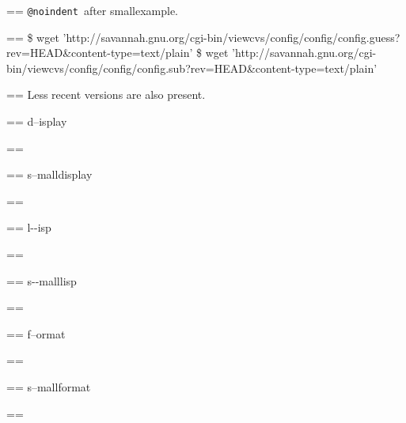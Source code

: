 \documentclass{book}
\makeatletter
\newenvironment{GNUTexinfopreformatted}{%
  \par\GNUTobeylines\obeyspaces\frenchspacing
  \parskip=\z@\parindent=\z@}{}
{\catcode`\^^M=13 \gdef\GNUTobeylines{\catcode`\^^M=13 \def^^M{\null\par}}}
\newenvironment{GNUTexinfoindented}
  {\begin{list}{}{}
  \item\relax}
  {\end{list}}
\makeatother
\begin{document}
\begin{GNUTexinfoindented}
\begin{GNUTexinfopreformatted}
\ttfamily 
\texttt{@noindent}\ after smallexample.
\end{GNUTexinfopreformatted}
\begin{GNUTexinfopreformatted}%
\ttfamily \footnotesize \$ wget 'http://savannah.gnu.org/cgi-bin/viewcvs/config/config/config.guess?rev=HEAD\&content-type=text/plain'
\$ wget 'http://savannah.gnu.org/cgi-bin/viewcvs/config/config/config.sub?rev=HEAD\&content-type=text/plain'
\end{GNUTexinfopreformatted}
\begin{GNUTexinfopreformatted}%
\ttfamily \noindent{}Less recent versions are also present.

\end{GNUTexinfopreformatted}
\begin{GNUTexinfoindented}
\begin{GNUTexinfopreformatted}%
d--isplay
\end{GNUTexinfopreformatted}
\end{GNUTexinfoindented}
\begin{GNUTexinfopreformatted}%
\ttfamily 
\end{GNUTexinfopreformatted}
\begin{GNUTexinfopreformatted}%
\footnotesize s--malldisplay
\end{GNUTexinfopreformatted}
\begin{GNUTexinfopreformatted}%
\ttfamily 
\end{GNUTexinfopreformatted}
\begin{GNUTexinfoindented}
\begin{GNUTexinfopreformatted}%
\ttfamily l{-}{-}isp
\end{GNUTexinfopreformatted}
\end{GNUTexinfoindented}
\begin{GNUTexinfopreformatted}%
\ttfamily 
\end{GNUTexinfopreformatted}
\begin{GNUTexinfopreformatted}%
\ttfamily \footnotesize s{-}{-}malllisp
\end{GNUTexinfopreformatted}
\begin{GNUTexinfopreformatted}%
\ttfamily 
\end{GNUTexinfopreformatted}
\begin{GNUTexinfopreformatted}%
f--ormat
\end{GNUTexinfopreformatted}
\begin{GNUTexinfopreformatted}%
\ttfamily 
\end{GNUTexinfopreformatted}
\begin{GNUTexinfopreformatted}%
\footnotesize s--mallformat
\end{GNUTexinfopreformatted}
\begin{GNUTexinfopreformatted}%
\ttfamily 
\end{GNUTexinfopreformatted}


\end{GNUTexinfoindented}
\end{document}
